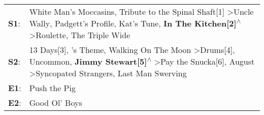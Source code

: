 \begin{supertabular}{p{0.03\textwidth}p{0.92\textwidth}}
 \textbf{S1}:  &                                                                          White Man's Moccasins\textsuperscript{}, \enspace Tribute to the Spinal Shaft[1]\textsuperscript{} \textgreater \enspace Uncle Wally\textsuperscript{}, \enspace Padgett's Profile\textsuperscript{}, \enspace Kat's Tune\textsuperscript{}, \enspace \textbf{In The Kitchen[2]\textsuperscript{$\wedge$}} \textgreater \enspace Roulette\textsuperscript{}, \enspace The Triple Wide\textsuperscript{}  \enspace  \\
 \textbf{S2}:  &  13 Days[3]\textsuperscript{}, 's Theme\textsuperscript{}, \enspace Walking On The Moon\textsuperscript{} \textgreater \enspace Drums[4]\textsuperscript{}, \enspace Uncommon\textsuperscript{}, \enspace \textbf{Jimmy Stewart[5]\textsuperscript{$\wedge$}} \textgreater \enspace Pay the Snucka[6]\textsuperscript{}, \enspace August\textsuperscript{} \textgreater \enspace Syncopated Strangers\textsuperscript{}, \enspace Last Man Swerving\textsuperscript{}  \enspace  \\
 \textbf{E1}:  &                                                                                                                                                                                                                                                                                                                                                                                                                                                   Push the Pig\textsuperscript{}  \enspace  \\
 \textbf{E2}:  &                                                                                                                                                                                                                                                                                                                                                                                                                                                  Good Ol' Boys\textsuperscript{}  \enspace  \\
\end{supertabular}
